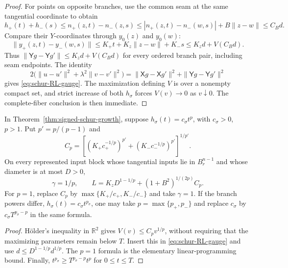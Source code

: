 \begin{proof}
For points on opposite branches, use the common seam at the same
tangential coordinate to obtain
\[
 h_+(t)+h_-(s)
 \le n_+(z,t)-n_-(z,s)
 \le|n_+(z,t)-n_-(w,s)|+B\|z-w\|
 \le C_Bd.
\]
Compare their \(Y\)-coordinates through \(y_0(z)\) and \(y_0(w)\):
\[
 \|y_+(z,t)-y_-(w,s)\|
 \le K_+t+K_z\|z-w\|+K_-s
 \le K_zd+V(C_Bd).
\]
Thus \(\|\mathsf Yg-\mathsf Yg'\|\le K_zd+V(C_Bd)\) for every
ordered branch pair, including seam endpoints.  The identity
\[
 2\bigl(\|u-u'\|^2+\lambda^2\|v-v'\|^2\bigr)
 =\|\mathsf Xg-\mathsf Xg'\|^2+\|\mathsf Yg-\mathsf Yg'\|^2
\]
gives \eqref{eq:schur-RL-gauge}.
The maximization defining \(V\) is over a nonempty compact set, and
strict increase of both \(h_\sigma\) forces \(V(v)\to0\) as
\(v\downarrow0\).  The complete-fiber conclusion is then immediate.
\end{proof}

\begin{corollary}
\label{cor:schur-power-constants}
In Theorem~\ref{thm:signed-schur-growth}, suppose
\(h_\sigma(t)=c_\sigma t^p\), with \(c_\sigma>0\), \(p>1\).
Put \(p'=p/(p-1)\) and
\[
 C_{p}=\left[
  (K_+c_+^{-1/p})^{p'}+(K_-c_-^{-1/p})^{p'}
 \right]^{1/p'}.
\]
On every represented input block whose tangential inputs lie in
\(B_r^{n-1}\) and whose diameter is at most \(D>0\),
\[
 \boxed{\quad\gamma=1/p,\qquad
 L=K_zD^{1-1/p}+(1+B^2)^{1/(2p)}C_p.\quad}
 \tag{S15}\label{eq:schur-explicit-L}
\]
For \(p=1\), replace \(C_p\) by
\(\max\{K_+/c_+,K_-/c_-\}\) and take \(\gamma=1\).
If the branch powers differ, \(h_\sigma(t)=c_\sigma t^{p_\sigma}\),
one may take \(p=\max\{p_+,p_-\}\) and replace
\(c_\sigma\) by \(c_\sigma T^{p_\sigma-p}\) in the same formula.
\end{corollary}

\begin{proof}
H\"older's inequality in \(\mathbb R^2\) gives
\(V(v)\le C_pv^{1/p}\), without requiring that the maximizing
parameters remain below \(T\).  Insert this in
\eqref{eq:schur-RL-gauge} and use
\(d\le D^{1-1/p}d^{1/p}\).  The \(p=1\) formula is the elementary
linear-programming bound.  Finally,
\(t^{p_\sigma}\ge T^{p_\sigma-p}t^p\) for \(0\le t\le T\).
\end{proof}

